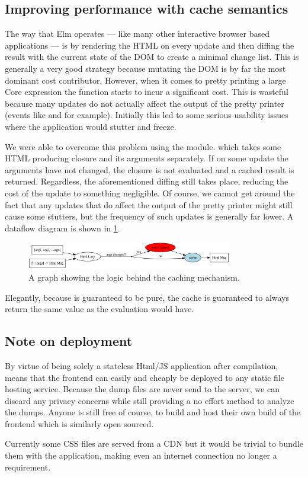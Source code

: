 \subsection{Improving performance with cache semantics}

The way that Elm operates --- like many other interactive browser based applications --- is by rendering the HTML on every
update and then diffing the result with the current state of the DOM to create a minimal change list. This is generally a very
good strategy because mutating the DOM is by far the most dominant cost contributor. However, when it comes to pretty printing a
large Core expression the  function starts to incur a significant cost. This is wasteful because many updates do not
actually affect the output of the pretty printer (events like  and  for example).
Initially this led to some serious usability issues where the application would stutter and freeze.

We were able to overcome this problem using the  module. which takes some HTML producing closure and its arguments
separately. If on some update the arguments have not changed, the closure is not evaluated and a cached result is returned. Regardless,
the aforementioned diffing still takes place, reducing the cost of the update to something negligible. Of course, we cannot get around the fact that
any updates that do affect the output of the pretty printer might still cause some stutters, but the frequency of such updates is 
generally far lower. A dataflow diagram is shown in \cref{fig:elm_cache}.

\begin{figure}[H]
  \centering
  \includegraphics[width=0.8\textwidth]{figs/elm_cache.png}
  \caption{A graph showing the logic behind the caching mechanism.}
  \label{fig:elm_cache}
\end{figure}

Elegantly, because  is guaranteed to be pure, the cache is guaranteed to always return the same value as the evaluation would have.

\subsection{Note on deployment}

By virtue of being solely a stateless Html/JS application after compilation, means that the frontend can
easily and cheaply be deployed to any static file hosting service. Because the dump files are never send to the server,
we can discard any privacy concerns while still providing a no effort method to analyze the dumps. Anyone is still free
of course, to build and host their own build of the frontend which is similarly open sourced.

Currently some CSS files are served from a CDN but it would be trivial to bundle them with the application, making even
an internet connection no longer a requirement.

